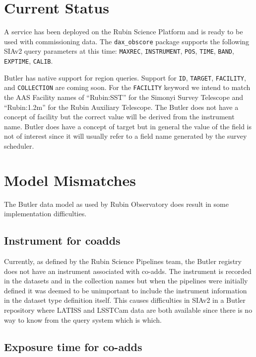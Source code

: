 \documentclass[11pt,twoside]{article}
\begin{document}
\section{Current Status}

A service has been deployed on the Rubin Science Platform and is ready to be used with commissioning data.
The \texttt{dax\_obscore} package supports the following SIAv2 query parameters at this time:
\texttt{MAXREC},
\texttt{INSTRUMENT},
\texttt{POS},
\texttt{TIME},
\texttt{BAND},
\texttt{EXPTIME},
\texttt{CALIB}.

Butler has native support for region queries.
Support for
\texttt{ID},
\texttt{TARGET},
\texttt{FACILITY},
and \texttt{COLLECTION} are coming soon.
For the \texttt{FACILITY} keyword we intend to match the AAS Facility names of ``Rubin:SST'' for the Simonyi Survey Telescope and ``Rubin:1.2m'' for the Rubin Auxiliary Telescope.
The Butler does not have a concept of facility but the correct value will be derived from the instrument name.
Butler does have a concept of target but in general the value of the field is not of interest since it will usually refer to a field name generated by the survey scheduler.

\section{Model Mismatches}

The Butler data model as used by Rubin Observatory does result in some implementation difficulties.

\subsection{Instrument for coadds}

Currently, as defined by the Rubin Science Pipelines team, the Butler registry does not have an instrument associated with co-adds.
The instrument is recorded in the datasets and in the collection names but when the pipelines were initially defined it was deemed to be unimportant to include the instrument information in the dataset type definition itself.
This causes difficulties in SIAv2 in a Butler repository where LATISS and LSSTCam data are both available since there is no way to know from the query system which is which.

\subsection{Exposure time for co-adds}
\end{document}

